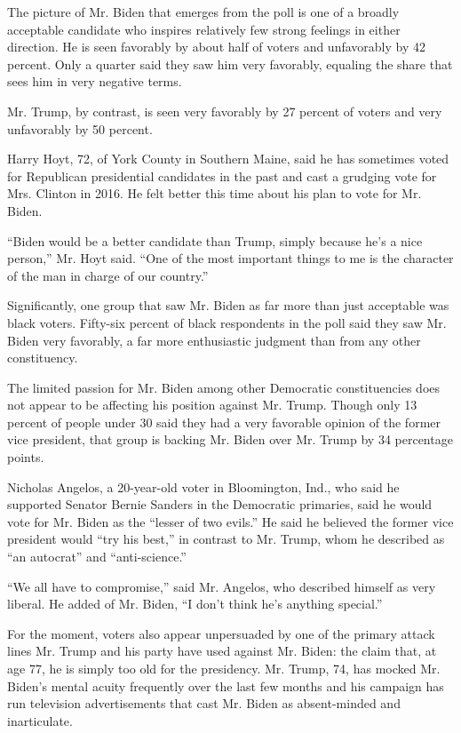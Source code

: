 The picture of Mr. Biden that emerges from the poll is one of a broadly
acceptable candidate who inspires relatively few strong feelings in
either direction. He is seen favorably by about half of voters and
unfavorably by 42 percent. Only a quarter said they saw him very
favorably, equaling the share that sees him in very negative terms.

Mr. Trump, by contrast, is seen very favorably by 27 percent of voters
and very unfavorably by 50 percent.

Harry Hoyt, 72, of York County in Southern Maine, said he has sometimes
voted for Republican presidential candidates in the past and cast a
grudging vote for Mrs. Clinton in 2016. He felt better this time about
his plan to vote for Mr. Biden.

``Biden would be a better candidate than Trump, simply because he's a
nice person,'' Mr. Hoyt said. ``One of the most important things to me
is the character of the man in charge of our country.''

Significantly, one group that saw Mr. Biden as far more than just
acceptable was black voters. Fifty-six percent of black respondents in
the poll said they saw Mr. Biden very favorably, a far more enthusiastic
judgment than from any other constituency.

The limited passion for Mr. Biden among other Democratic constituencies
does not appear to be affecting his position against Mr. Trump. Though
only 13 percent of people under 30 said they had a very favorable
opinion of the former vice president, that group is backing Mr. Biden
over Mr. Trump by 34 percentage points.

Nicholas Angelos, a 20-year-old voter in Bloomington, Ind., who said he
supported Senator Bernie Sanders in the Democratic primaries, said he
would vote for Mr. Biden as the ``lesser of two evils.'' He said he
believed the former vice president would ``try his best,'' in contrast
to Mr. Trump, whom he described as ``an autocrat'' and ``anti-science.''

``We all have to compromise,'' said Mr. Angelos, who described himself
as very liberal. He added of Mr. Biden, ``I don't think he's anything
special.''

For the moment, voters also appear unpersuaded by one of the primary
attack lines Mr. Trump and his party have used against Mr. Biden: the
claim that, at age 77, he is simply too old for the presidency. Mr.
Trump, 74, has mocked Mr. Biden's mental acuity frequently over the last
few months and his campaign has run television advertisements that cast
Mr. Biden as absent-minded and inarticulate.

